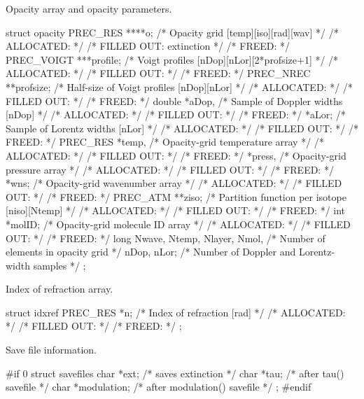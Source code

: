 \documentclass[letterpaper,12pt]{article}
\begin{document}
\noindent \newline
Opacity array and opacity parameters.
\begin{plain}
struct opacity{
  PREC_RES ****o;         /* Opacity grid [temp][iso][rad][wav]             */
    /* ALLOCATED:							    */
    /* FILLED OUT: extinction							    */
    /* FREED: 								    */ 
  PREC_VOIGT ***profile;  /* Voigt profiles [nDop][nLor][2*profsize+1]      */
    /* ALLOCATED:							    */
    /* FILLED OUT:							    */
    /* FREED: 								    */ 
  PREC_NREC **profsize;   /* Half-size of Voigt profiles [nDop][nLor]       */
    /* ALLOCATED:							    */
    /* FILLED OUT:							    */
    /* FREED: 								    */ 
  double *aDop,           /* Sample of Doppler widths [nDop]                */
    /* ALLOCATED:							    */
    /* FILLED OUT:							    */
    /* FREED: 								    */ 
         *aLor;           /* Sample of Lorentz widths [nLor]                */
    /* ALLOCATED:							    */
    /* FILLED OUT:							    */
    /* FREED: 								    */ 
  PREC_RES *temp,         /* Opacity-grid temperature array                 */
    /* ALLOCATED:							    */
    /* FILLED OUT:							    */
    /* FREED: 								    */ 
           *press,        /* Opacity-grid pressure array                    */
    /* ALLOCATED:							    */
    /* FILLED OUT:							    */
    /* FREED: 								    */ 
           *wns;          /* Opacity-grid wavenumber array                  */
    /* ALLOCATED:							    */
    /* FILLED OUT:							    */
    /* FREED: 								    */ 
  PREC_ATM **ziso;        /* Partition function per isotope [niso][Ntemp]   */
    /* ALLOCATED:							    */
    /* FILLED OUT:							    */
    /* FREED: 								    */ 
  int *molID;             /* Opacity-grid molecule ID array                 */
    /* ALLOCATED:							    */
    /* FILLED OUT:							    */
    /* FREED: 								    */ 
  long Nwave, Ntemp, Nlayer, Nmol, /* Number of elements in opacity grid    */
      nDop, nLor;         /* Number of Doppler and Lorentz-width samples    */
};
\end{plain}

\noindent \newline
Index of refraction array.
\begin{plain}
struct idxref{
  PREC_RES *n;   /* Index of refraction [rad]                               */
    /* ALLOCATED:							    */
    /* FILLED OUT:							    */
    /* FREED: 								    */ 
};
\end{plain}

\noindent \newline
Save file information.
\begin{plain}
#if 0
struct savefiles {
  char *ext;         /* saves extinction            */
  char *tau;  	     /* after tau() savefile        */
  char *modulation;  /* after modulation() savefile */
};
#endif
\end{plain}
\end{document}
